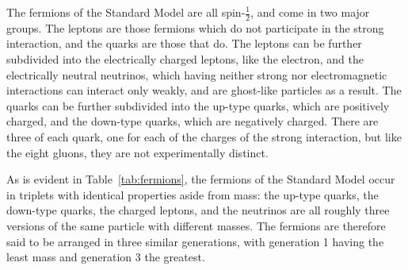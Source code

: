   The fermions of the Standard Model are all spin-$\frac{1}{2}$, and come in two major groups.
  The leptons are those fermions which do not participate in the strong interaction, and the quarks are those that do.
  The leptons can be further subdivided into the electrically charged leptons, like the electron, and the electrically neutral neutrinos, which having neither strong nor electromagnetic interactions can interact only weakly, and are ghost-like particles as a result.
  The quarks can be further subdivided into the up-type quarks, which are positively charged, and the down-type quarks, which are negatively charged.
  There are three of each quark, one for each of the charges of the strong interaction, but like the eight gluons, they are not experimentally distinct.

  As is evident in Table~\ref{tab:fermions}, the fermions of the Standard Model occur in triplets with identical properties aside from mass: the up-type quarks, the down-type quarks, the charged leptons, and the neutrinos are all roughly three versions of the same particle with different masses.
  The fermions are therefore said to be arranged in three similar generations, with generation 1 having the least mass and generation 3 the greatest.

